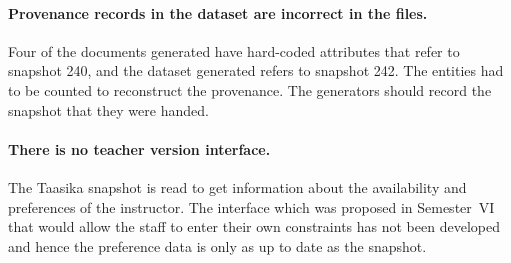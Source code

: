 \paragraph{Provenance records in the dataset are incorrect in the files.} Four of the documents
generated have hard-coded attributes that refer to snapshot 240, and the dataset generated refers
to snapshot 242. The entities had to be counted to reconstruct the provenance. The generators
should record the snapshot that they were handed.

\paragraph{There is no teacher version interface.} The Taasika snapshot is read to get information
about the availability and preferences of the instructor. The interface which was proposed in
Semester~VI that would allow the staff to enter their own constraints has not been developed and
hence the preference data is only as up to date as the snapshot.
